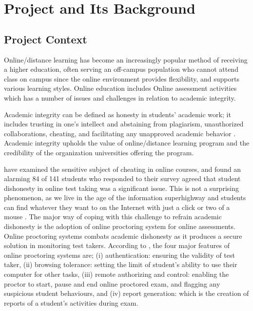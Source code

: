 \chapter{Project and Its Background}

\section{Project Context}

Online/distance learning has become an increasingly popular method of receiving a higher education, often serving an off-campus population who cannot attend class on campus \cite{daffin2018comparing} since the online environment provides flexibility, and supports various learning styles.
Online education includes Online assessment activities which has a number of issues and challenges in relation to academic integrity.

Academic integrity can be defined as honesty in students' academic work; it includes trusting in one’s intellect and abstaining from plagiarism, unauthorized collaborations, cheating, and facilitating any unapproved academic behavior \cite{cronan2017changing}.
Academic integrity upholds the value of online/distance learning program and the credibility of the organization universities offering the program.

 have examined the sensitive subject of cheating in online courses, and found an alarming 84 of 141 students who responded to their survey agreed that student dishonesty in online test taking was a significant issue.
This is not a surprising phenomenon, as we live in the age of the information superhighway and students can find whatever they want to on the Internet with just a click or two of a mouse \cite{daffin2018comparing}.
The major way of coping with this challenge to refrain academic dishonesty is the adoption of online proctoring system for online assessments.
Online proctoring systems combats academic dishonesty as it produces a secure solution in monitoring test takers.
According to , the four major features of online proctoring systems are; (i) authentication: ensuring the validity of test taker, (ii) browsing tolerance: setting the limit of student’s ability to use their computer for other tasks, (iii) remote authorizing and control: enabling the proctor to start, pause and end online proctored exam, and flagging any suspicious student behaviours, and (iv) report generation: which is the creation of reports of a student’s activities during exam.

